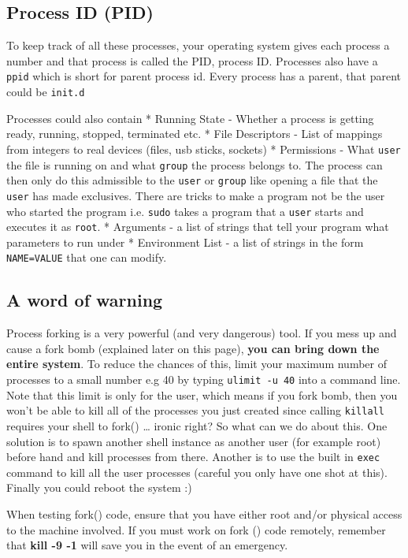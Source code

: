 \subsection{Process ID (PID)}\label{process-id-pid}

To keep track of all these processes, your operating system gives each
process a number and that process is called the PID, process ID.
Processes also have a \texttt{ppid} which is short for parent process
id. Every process has a parent, that parent could be \texttt{init.d}

Processes could also contain * Running State - Whether a process is
getting ready, running, stopped, terminated etc. * File Descriptors -
List of mappings from integers to real devices (files, usb sticks,
sockets) * Permissions - What \texttt{user} the file is running on and
what \texttt{group} the process belongs to. The process can then only do
this admissible to the \texttt{user} or \texttt{group} like opening a
file that the \texttt{user} has made exclusives. There are tricks to
make a program not be the user who started the program i.e.
\texttt{sudo} takes a program that a \texttt{user} starts and executes
it as \texttt{root}. * Arguments - a list of strings that tell your
program what parameters to run under * Environment List - a list of
strings in the form \texttt{NAME=VALUE} that one can modify.

\subsection{A word of warning}\label{a-word-of-warning}

Process forking is a very powerful (and very dangerous) tool. If you
mess up and cause a fork bomb (explained later on this page),
\textbf{you can bring down the entire system}. To reduce the chances of
this, limit your maximum number of processes to a small number e.g 40 by
typing \texttt{ulimit\ -u\ 40} into a command line. Note that this limit
is only for the user, which means if you fork bomb, then you won't be
able to kill all of the processes you just created since calling
\texttt{killall} requires your shell to fork() \ldots{} ironic right? So
what can we do about this. One solution is to spawn another shell
instance as another user (for example root) before hand and kill
processes from there. Another is to use the built in \texttt{exec}
command to kill all the user processes (careful you only have one shot
at this). Finally you could reboot the system :)

When testing fork() code, ensure that you have either root and/or
physical access to the machine involved. If you must work on fork ()
code remotely, remember that \textbf{kill -9 -1} will save you in the
event of an emergency.

